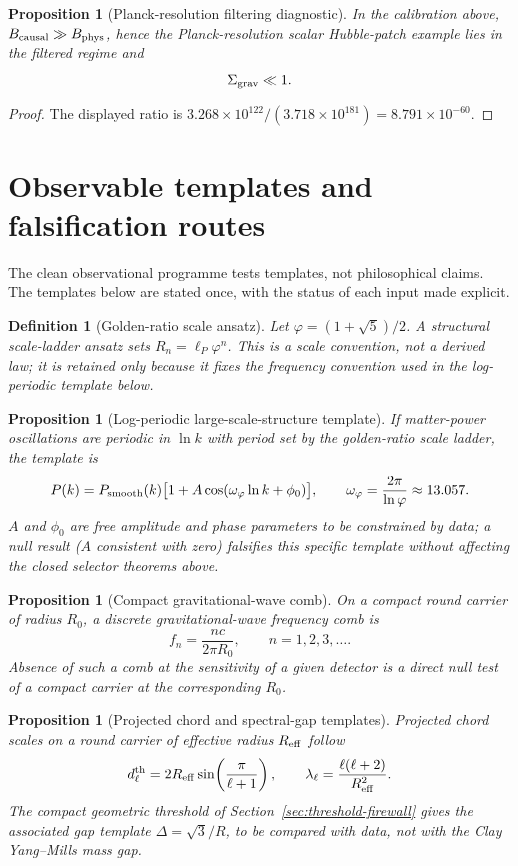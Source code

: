 \documentclass[11pt,a4paper]{article}
\newtheorem{proposition}[theorem]{Proposition}
\newtheorem{definition}[theorem]{Definition}
\begin{document}
\begin{proposition}[Planck-resolution filtering diagnostic]
In the calibration above, $B_{\rm causal}\gg B_{\rm phys}$, hence the Planck-resolution scalar Hubble-patch example lies in the filtered regime and
\[
\Sigma_{\rm grav}\ll1.
\]
\end{proposition}
\begin{proof}
The displayed ratio is $3.268\times10^{122}/(3.718\times10^{181})=8.791\times10^{-60}$.\end{proof}


\section{Observable templates and falsification routes}

The clean observational programme tests templates, not philosophical claims.  The templates below are stated once, with the status of each input made explicit.

\begin{definition}[Golden-ratio scale ansatz]
Let $\varphi=(1+\sqrt5)/2$.  A structural scale-ladder ansatz sets $R_n=\ell_P\varphi^n$.  This is a scale convention, not a derived law; it is retained only because it fixes the frequency convention used in the log-periodic template below.
\end{definition}

\begin{proposition}[Log-periodic large-scale-structure template]
If matter-power oscillations are periodic in $\ln k$ with period set by the golden-ratio scale ladder, the template is
\[
P(k)=P_{\rm smooth}(k)\bigl[1+A\cos(\omega_\varphi\ln k+\phi_0)\bigr],
\qquad
\omega_\varphi=\frac{2\pi}{\ln\varphi}\approx13.057.
\]
$A$ and $\phi_0$ are free amplitude and phase parameters to be constrained by data; a null result ($A$ consistent with zero) falsifies this specific template without affecting the closed selector theorems above.
\end{proposition}

\begin{proposition}[Compact gravitational-wave comb]
On a compact round carrier of radius $R_0$, a discrete gravitational-wave frequency comb is
\[
f_n=\frac{nc}{2\pi R_0},\qquad n=1,2,3,\dots.
\]
Absence of such a comb at the sensitivity of a given detector is a direct null test of a compact carrier at the corresponding $R_0$.
\end{proposition}

\begin{proposition}[Projected chord and spectral-gap templates]
Projected chord scales on a round carrier of effective radius $R_{\rm eff}$ follow
\[
d_\ell^{\rm th}=2R_{\rm eff}\sin\!\left(\frac{\pi}{\ell+1}\right),
\qquad
\lambda_\ell=\frac{\ell(\ell+2)}{R_{\rm eff}^2}.
\]
The compact geometric threshold of Section~\ref{sec:threshold-firewall} gives the associated gap template $\Delta=\sqrt3/R$, to be compared with data, not with the Clay Yang--Mills mass gap.
\end{proposition}
\end{document}
